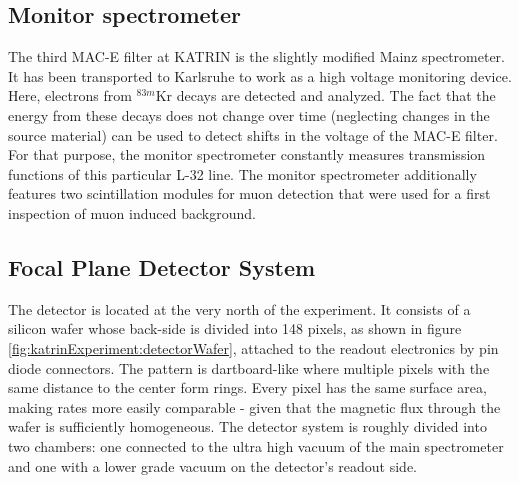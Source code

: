       \subsection{Monitor spectrometer}
      \label{ch:TheKATRINexperiment:sec:experimentalSetup:subsec:monSpec}
      
      The third MAC-E filter at KATRIN is the slightly modified Mainz spectrometer. It has been transported to Karlsruhe to work as a high voltage monitoring device. Here, electrons from $^{83m}$Kr decays are detected and analyzed. The fact that the energy from these decays does not change over time (neglecting changes in the source material) can be used to detect shifts in the voltage of the MAC-E filter. For that purpose, the monitor spectrometer constantly measures transmission functions of this particular L-32 line.
      The monitor spectrometer additionally features two scintillation modules for muon detection that were used for a first inspection of muon induced background.

     
      \subsection{Focal Plane Detector System}
      \label{ch:The KATRIN experiment:sec:Experimental setup:subsec:FPD system}
      The detector is located at the very north of the experiment. It consists of a silicon wafer whose back-side is divided into 148 pixels, as shown in figure \ref{fig:katrinExperiment:detectorWafer}, attached to the readout electronics by pin diode connectors. The pattern is dartboard-like where multiple pixels with the same distance to the center form rings. Every pixel has the same surface area, making rates more easily comparable - given that the magnetic flux through the wafer is sufficiently homogeneous.
      The detector system is roughly divided into two chambers: one connected to the ultra high vacuum of the main spectrometer and one with a lower grade vacuum on the detector's readout side.
      
